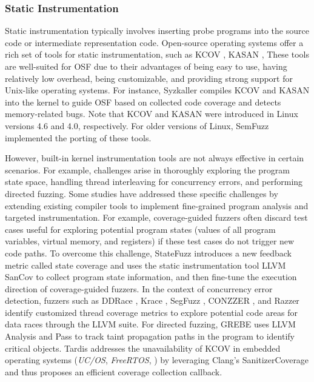 \subsubsection{Static Instrumentation}

Static instrumentation typically involves inserting probe programs into the source code or intermediate representation code. Open-source operating systems offer a rich set of tools for static instrumentation, such as KCOV \cite{vyukov2018kcov}, KASAN \cite{kernel2018kasan}, \etc These tools are well-suited for OSF due to their advantages of being easy to use, having relatively low overhead, being customizable, and providing strong support for Unix-like operating systems. For instance, Syzkaller \cite{Syzkaller} compiles KCOV and KASAN into the kernel to guide OSF based on collected code coverage and detects memory-related bugs. Note that KCOV and KASAN were introduced in Linux versions 4.6 and 4.0, respectively. For older versions of Linux, SemFuzz \cite{you2017semfuzz} implemented the porting of these tools.

However, built-in kernel instrumentation tools are not always effective in certain scenarios. For example, challenges arise in thoroughly exploring the program state space, handling thread interleaving for concurrency errors, and performing directed fuzzing. Some studies have addressed these specific challenges by extending existing compiler tools to implement fine-grained program analysis and targeted instrumentation. For example, coverage-guided fuzzers often discard test cases useful for exploring potential program states (\ie values of all program variables, virtual memory, and registers) if these test cases do not trigger new code paths. To overcome this challenge, StateFuzz \cite{zhao2022statefuzz} introduces a new feedback metric called state coverage and uses the static instrumentation tool LLVM SanCov to collect program state information, and then fine-tune the execution direction of coverage-guided fuzzers. In the context of concurrency error detection, fuzzers such as DDRace \cite{Yuan2023DDRace}, Krace \cite{xu2020krace}, SegFuzz \cite{jeong2023segfuzz}, CONZZER \cite{CONZZER2022context}, and Razzer identify customized thread coverage metrics to explore potential code areas for data races through the LLVM suite. For directed fuzzing, GREBE \cite{lin2022grebe} uses LLVM Analysis and Pass to track taint propagation paths in the program to identify critical objects. Tardis \cite{shen2022tardis} addresses the unavailability of KCOV in embedded operating systems (\eg \textit{UC/OS}, \textit{FreeRTOS}, \etc) by leveraging Clang's SanitizerCoverage and thus proposes an efficient coverage collection callback.

